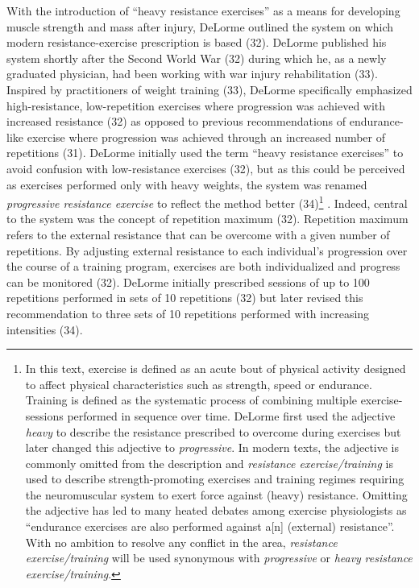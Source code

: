 \documentclass[twoside,10pt]{gihclass} %
\begin{document}
With the introduction of ``heavy resistance exercises'' as a means for developing muscle strength and mass after injury, DeLorme outlined the system on which modern resistance-exercise prescription is based (32).
DeLorme published his system shortly after the Second World War (32)
during which he, as a newly graduated physician, had been working with war injury rehabilitation
(33).
Inspired by practitioners of weight training (33),
DeLorme specifically emphasized high-resistance, low-repetition exercises where progression was achieved with increased resistance (32) as opposed to previous recommendations of endurance-like exercise where progression was achieved through an increased number of repetitions
(31).
DeLorme initially used the term ``heavy resistance exercises'' to avoid confusion with low-resistance exercises (32), but as this could be perceived as exercises performed only with heavy weights, the system was renamed \emph{progressive resistance exercise} to reflect the method better
(34)\footnote{In this text, exercise is defined as an acute bout of physical activity designed to affect physical characteristics such as strength, speed or endurance. Training is defined as the systematic process of combining multiple exercise-sessions performed in sequence over time. DeLorme first used the adjective \emph{heavy} to describe the resistance prescribed to overcome during exercises but later changed this adjective to \emph{progressive}. In modern texts, the adjective is commonly omitted from the description and \emph{resistance exercise/training} is used to describe strength-promoting exercises and training regimes requiring the neuromuscular system to exert force against (heavy) resistance. Omitting the adjective has led to many heated debates among exercise physiologists as ``endurance exercises are also performed against a{[}n{]} (external) resistance''. With no ambition to resolve any conflict in the area, \emph{resistance exercise/training} will be used synonymous with \emph{progressive} or \emph{heavy} \emph{resistance exercise/training}.}
.
Indeed, central to the system was the concept of repetition maximum (32).
Repetition maximum refers to the external resistance that can be overcome with a given number of repetitions.
By adjusting external resistance to each individual's progression over the course of a training program, exercises are both individualized and progress can be monitored (32).
DeLorme initially prescribed sessions of up to 100 repetitions performed in sets of 10 repetitions (32) but later revised this recommendation to three sets of 10 repetitions performed with increasing intensities
(34).
\end{document}

